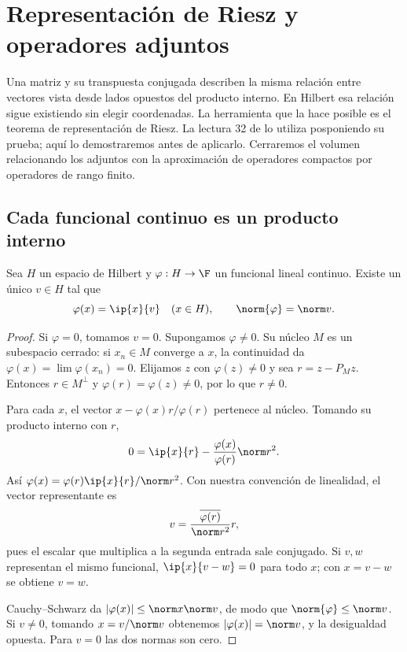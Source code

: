 \chapter{Representación de Riesz y operadores adjuntos}\label{chap:32}

Una matriz y su transpuesta conjugada describen la misma relación entre vectores vista desde lados opuestos del producto interno. En Hilbert esa relación sigue existiendo sin elegir coordenadas. La herramienta que la hace posible es el teorema de representación de Riesz. La lectura 32 de \cite{valencia} lo utiliza posponiendo su prueba; aquí lo demostraremos antes de aplicarlo. Cerraremos el volumen relacionando los adjuntos con la aproximación de operadores compactos por operadores de rango finito.

\section{Cada funcional continuo es un producto interno}
\begin{teorema}\label{ch32:riesz}
Sea $H$ un espacio de Hilbert y $\varphi:H\to\F$ un funcional lineal continuo. Existe un único $v\in H$ tal que
\[
 \varphi(x)=\ip{x}{v}\quad(x\in H),\qquad \norm{\varphi}=\norm v.
\]
\end{teorema}
\begin{proof}
Si $\varphi=0$, tomamos $v=0$. Supongamos $\varphi\ne0$. Su núcleo $M$ es un subespacio cerrado: si $x_n\in M$ converge a $x$, la continuidad da $\varphi(x)=\lim\varphi(x_n)=0$. Elijamos $z$ con $\varphi(z)\ne0$ y sea $r=z-P_Mz$. Entonces $r\in M^{\perp}$ y $\varphi(r)=\varphi(z)\ne0$, por lo que $r\ne0$.

Para cada $x$, el vector $x-\varphi(x)r/\varphi(r)$ pertenece al núcleo. Tomando su producto interno con $r$,
\[
0=\ip{x}{r}-\frac{\varphi(x)}{\varphi(r)}\norm r^{2}.
\]
Así $\varphi(x)=\varphi(r)\ip{x}{r}/\norm r^{2}$. Con nuestra convención de linealidad, el vector representante es
\[
 v=\frac{\overline{\varphi(r)}}{\norm r^{2}}r,
\]
pues el escalar que multiplica a la segunda entrada sale conjugado. Si $v,w$ representan el mismo funcional, $\ip{x}{v-w}=0$ para todo $x$; con $x=v-w$ se obtiene $v=w$.

Cauchy--Schwarz da $|\varphi(x)|\leq\norm x\norm v$, de modo que $\norm{\varphi}\leq\norm v$. Si $v\ne0$, tomando $x=v/\norm v$ obtenemos $|\varphi(x)|=\norm v$, y la desigualdad opuesta. Para $v=0$ las dos normas son cero.
\end{proof}

